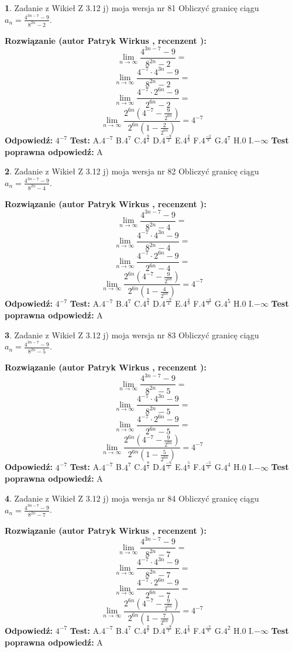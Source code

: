 \documentclass[12pt, a4paper]{article}
\theoremstyle{definition} %
\newtheorem{zad}{}
\newcommand{\zadStart}[1]{\begin{zad}#1\newline}
\newcommand{\zadStop}{\end{zad}}
\newcommand{\rozwStart}[2]{\noindent \textbf{Rozwiązanie (autor #1 , recenzent #2): }\newline}
\newcommand{\rozwStop}{\newline}
\newcommand{\odpStart}{\noindent \textbf{Odpowiedź:}\newline}
\newcommand{\odpStop}{\newline}
\newcommand{\testStart}{\noindent \textbf{Test:}\newline}
\newcommand{\testStop}{\newline}
\newcommand{\kluczStart}{\noindent \textbf{Test poprawna odpowiedź:}\newline}
\newcommand{\kluczStop}{\newline}
\begin{document}
\zadStart{Zadanie z Wikieł Z 3.12 j) moja wersja nr 81}
Obliczyć granicę ciągu $a_{n}=\frac{4^{3n-7}-9}{8^{2n}-2}$.
\zadStop
\rozwStart{Patryk Wirkus}{}
$$\lim\limits_{n\to\infty}\frac{4^{3n-7}-9}{8^{2n}-2}=$$
$$\lim\limits_{n\to\infty}\frac{4^{-7} \cdot 4^{3n}-9}{8^{2n}-2}=$$
$$\lim\limits_{n\to\infty}\frac{4^{-7} \cdot 2^{6n}-9}{2^{6n}-2}=$$
$$\lim\limits_{n\to\infty}\frac{2^{6n}(4^{-7} - \frac{9}{2^{6n}})}{2^{6n}(1-\frac{2}{2^{6n}})}= 4^{-7}$$
\rozwStop
\odpStart
$4^{-7}$
\odpStop
\testStart
A.$4^{-7}$
B.$4^{7}$
C.$4^{\frac{9}{2}}$
D.$4^{\frac{-9}{2}}$
E.$4^{\frac{2}{9}}$
F.$4^{\frac{-2}{9}}$
G.$4^{7}$
H.$0$
I.$-\infty$
\testStop
\kluczStart
A
\kluczStop



\zadStart{Zadanie z Wikieł Z 3.12 j) moja wersja nr 82}
Obliczyć granicę ciągu $a_{n}=\frac{4^{3n-7}-9}{8^{2n}-4}$.
\zadStop
\rozwStart{Patryk Wirkus}{}
$$\lim\limits_{n\to\infty}\frac{4^{3n-7}-9}{8^{2n}-4}=$$
$$\lim\limits_{n\to\infty}\frac{4^{-7} \cdot 4^{3n}-9}{8^{2n}-4}=$$
$$\lim\limits_{n\to\infty}\frac{4^{-7} \cdot 2^{6n}-9}{2^{6n}-4}=$$
$$\lim\limits_{n\to\infty}\frac{2^{6n}(4^{-7} - \frac{9}{2^{6n}})}{2^{6n}(1-\frac{4}{2^{6n}})}= 4^{-7}$$
\rozwStop
\odpStart
$4^{-7}$
\odpStop
\testStart
A.$4^{-7}$
B.$4^{7}$
C.$4^{\frac{9}{4}}$
D.$4^{\frac{-9}{4}}$
E.$4^{\frac{4}{9}}$
F.$4^{\frac{-4}{9}}$
G.$4^{5}$
H.$0$
I.$-\infty$
\testStop
\kluczStart
A
\kluczStop



\zadStart{Zadanie z Wikieł Z 3.12 j) moja wersja nr 83}
Obliczyć granicę ciągu $a_{n}=\frac{4^{3n-7}-9}{8^{2n}-5}$.
\zadStop
\rozwStart{Patryk Wirkus}{}
$$\lim\limits_{n\to\infty}\frac{4^{3n-7}-9}{8^{2n}-5}=$$
$$\lim\limits_{n\to\infty}\frac{4^{-7} \cdot 4^{3n}-9}{8^{2n}-5}=$$
$$\lim\limits_{n\to\infty}\frac{4^{-7} \cdot 2^{6n}-9}{2^{6n}-5}=$$
$$\lim\limits_{n\to\infty}\frac{2^{6n}(4^{-7} - \frac{9}{2^{6n}})}{2^{6n}(1-\frac{5}{2^{6n}})}= 4^{-7}$$
\rozwStop
\odpStart
$4^{-7}$
\odpStop
\testStart
A.$4^{-7}$
B.$4^{7}$
C.$4^{\frac{9}{5}}$
D.$4^{\frac{-9}{5}}$
E.$4^{\frac{5}{9}}$
F.$4^{\frac{-5}{9}}$
G.$4^{4}$
H.$0$
I.$-\infty$
\testStop
\kluczStart
A
\kluczStop



\zadStart{Zadanie z Wikieł Z 3.12 j) moja wersja nr 84}
Obliczyć granicę ciągu $a_{n}=\frac{4^{3n-7}-9}{8^{2n}-7}$.
\zadStop
\rozwStart{Patryk Wirkus}{}
$$\lim\limits_{n\to\infty}\frac{4^{3n-7}-9}{8^{2n}-7}=$$
$$\lim\limits_{n\to\infty}\frac{4^{-7} \cdot 4^{3n}-9}{8^{2n}-7}=$$
$$\lim\limits_{n\to\infty}\frac{4^{-7} \cdot 2^{6n}-9}{2^{6n}-7}=$$
$$\lim\limits_{n\to\infty}\frac{2^{6n}(4^{-7} - \frac{9}{2^{6n}})}{2^{6n}(1-\frac{7}{2^{6n}})}= 4^{-7}$$
\rozwStop
\odpStart
$4^{-7}$
\odpStop
\testStart
A.$4^{-7}$
B.$4^{7}$
C.$4^{\frac{9}{7}}$
D.$4^{\frac{-9}{7}}$
E.$4^{\frac{7}{9}}$
F.$4^{\frac{-7}{9}}$
G.$4^{2}$
H.$0$
I.$-\infty$
\testStop
\kluczStart
A
\kluczStop
\end{document}
